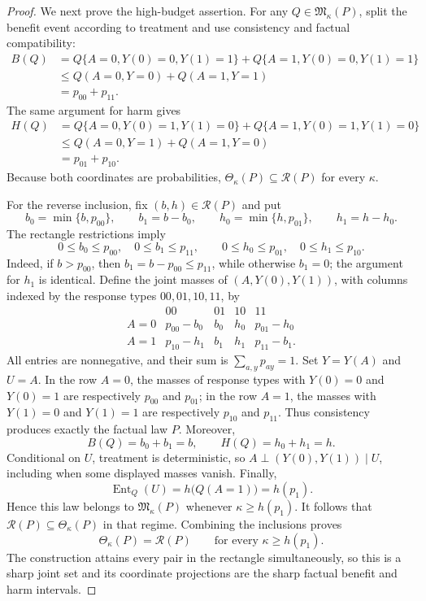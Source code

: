 \documentclass{article}
\begin{document}
\begin{proof}
We next prove the high-budget assertion. For any \(Q\in\mathfrak M_\kappa(P)\), split the benefit event according to treatment and use consistency and factual compatibility:
\[
\begin{aligned}
B(Q)
&=Q\{A=0,Y(0)=0,Y(1)=1\}
  +Q\{A=1,Y(0)=0,Y(1)=1\}\\
&\leq Q(A=0,Y=0)+Q(A=1,Y=1)\\
&=p_{00}+p_{11}.
\end{aligned}
\]
The same argument for harm gives
\[
\begin{aligned}
H(Q)
&=Q\{A=0,Y(0)=1,Y(1)=0\}
  +Q\{A=1,Y(0)=1,Y(1)=0\}\\
&\leq Q(A=0,Y=1)+Q(A=1,Y=0)\\
&=p_{01}+p_{10}.
\end{aligned}
\]
Because both coordinates are probabilities, \(\Theta_\kappa(P)\subseteq\mathcal R(P)\) for every \(\kappa\).

For the reverse inclusion, fix \((b,h)\in\mathcal R(P)\) and put
\[
b_0=\min\{b,p_{00}\},\qquad b_1=b-b_0,
\qquad
h_0=\min\{h,p_{01}\},\qquad h_1=h-h_0.
\]
The rectangle restrictions imply
\[
0\leq b_0\leq p_{00},\quad 0\leq b_1\leq p_{11},
\qquad
0\leq h_0\leq p_{01},\quad 0\leq h_1\leq p_{10}.
\]
Indeed, if \(b>p_{00}\), then \(b_1=b-p_{00}\leq p_{11}\), while otherwise \(b_1=0\); the argument for \(h_1\) is identical. Define the joint masses of \((A,Y(0),Y(1))\), with columns indexed by the response types \(00,01,10,11\), by
\[
\begin{array}{c|cccc}
 &00&01&10&11\\ \hline
A=0&p_{00}-b_0&b_0&h_0&p_{01}-h_0\\
A=1&p_{10}-h_1&b_1&h_1&p_{11}-b_1.
\end{array}
\]
All entries are nonnegative, and their sum is \(\sum_{a,y}p_{ay}=1\). Set \(Y=Y(A)\) and \(U=A\). In the row \(A=0\), the masses of response types with \(Y(0)=0\) and \(Y(0)=1\) are respectively \(p_{00}\) and \(p_{01}\); in the row \(A=1\), the masses with \(Y(1)=0\) and \(Y(1)=1\) are respectively \(p_{10}\) and \(p_{11}\). Thus consistency produces exactly the factual law \(P\). Moreover,
\[
B(Q)=b_0+b_1=b,
\qquad
H(Q)=h_0+h_1=h.
\]
Conditional on \(U\), treatment is deterministic, so \(A\perp(Y(0),Y(1))\mid U\), including when some displayed masses vanish. Finally,
\[
\operatorname{Ent}_Q(U)=h\bigl(Q(A=1)\bigr)=h(p_1).
\]
Hence this law belongs to \(\mathfrak M_\kappa(P)\) whenever \(\kappa\geq h(p_1)\). It follows that \(\mathcal R(P)\subseteq\Theta_\kappa(P)\) in that regime. Combining the inclusions proves
\[
\Theta_\kappa(P)=\mathcal R(P)\qquad\text{for every }\kappa\geq h(p_1).
\]
The construction attains every pair in the rectangle simultaneously, so this is a sharp joint set and its coordinate projections are the sharp factual benefit and harm intervals.
\end{proof}
\end{document}
